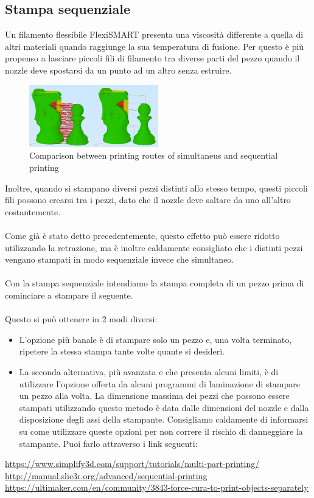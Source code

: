 \documentclass[11pt,a4paper]{article}
\begin{document}
	\subsection{Stampa sequenziale}
Un filamento flessibile FlexiSMART presenta una viscosità differente a quella di altri materiali quando raggiunge la sua temperatura di fusione. Per questo è più propenso a lasciare piccoli fili di filamento tra diverse parti del pezzo quando il nozzle deve spostarsi da un punto ad un altro senza estruire. 
\begin{figure}[H]
\centering
\includegraphics[width=0.5\textwidth,cfbox=azul_marcos 4pt 0pt]{FOTOS/SEQUENTIALPRINTING}
\caption*{Comparison between printing routes of simultaneus and sequential printing}
\end{figure}
Inoltre, quando si stampano diversi pezzi distinti allo stesso tempo, questi piccoli fili possono crearsi tra i pezzi, dato che il nozzle deve saltare da uno all'altro costantemente.
\\\\
Come già è stato detto precedentemente, questo effetto può essere ridotto utilizzando la retrazione, ma è inoltre caldamente consigliato che i distinti pezzi vengano stampati in modo sequenziale invece che simultaneo.
\\\\
Con la stampa sequenziale intendiamo la stampa completa di un pezzo prima di cominciare a stampare il seguente.
\\\\
Questo si può ottenere in 2 modi diversi:
\begin{itemize}
\item L'opzione più banale è di stampare solo un pezzo e, una volta terminato, ripetere la stessa stampa tante volte quante si desideri.
\item La seconda alternativa, più avanzata e che presenta alcuni limiti, è di utilizzare l'opzione offerta da alcuni programmi di laminazione di stampare un pezzo alla volta. La dimensione massima dei pezzi che possono essere stampati utilizzando questo metodo è data dalle dimensioni del nozzle e dalla disposizione degli assi della stampante. Consigliamo caldamente di informarsi su come utilizzare queste opzioni per non correre il rischio di danneggiare la stampante. Puoi farlo attraverso i link seguenti:
\end{itemize}
\url{https://www.simplify3d.com/support/tutorials/multi-part-printing/}\\
\url{http://manual.slic3r.org/advanced/sequential-printing}\\
\url{https://ultimaker.com/en/community/3843-force-cura-to-print-objects-separately}
\end{document}
